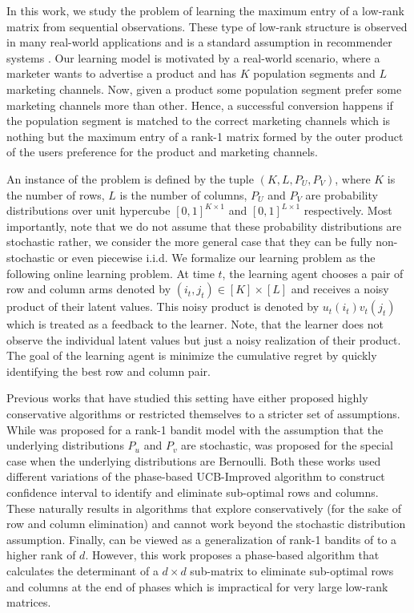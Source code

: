 In this work, we study the problem of learning the maximum entry of a low-rank matrix from sequential observations. These type of low-rank structure is observed in many real-world applications and is a standard assumption in recommender systems \citep{koren2009matrix,ricci2011liorrokach}. Our learning model is motivated by a real-world scenario, where a marketer wants to advertise a product and has $K$ population segments and $L$ marketing channels. Now, given a product some population segment prefer some marketing channels more than other. Hence, a successful conversion happens if the population segment is matched to the correct marketing channels which is nothing but the maximum entry of a rank-1 matrix formed by the outer product of the users preference for the product and marketing channels.  



An instance of the problem is defined by the tuple $(K,L,P_U,P_V)$, where $K$ is the number of rows, $L$ is the number of columns, $P_U$ and $P_V$ are probability distributions over unit hypercube $[0,1]^{K\times 1}$ and $[0,1]^{L\times 1}$ respectively. Most importantly, note that we do not assume that these probability distributions are stochastic rather, we consider the more general case that they can be fully non-stochastic or even piecewise i.i.d. We formalize our learning problem as the following online learning problem. At time $t$, the learning agent chooses a pair of row and column arms denoted by $(i_t, j_t) \in [K]\times [L]$ and receives a noisy product of their latent values. This noisy product is denoted by $u_t(i_t)v_t(j_t)$ which is treated as a feedback to the learner. Note, that the learner does not observe the individual latent values but just a noisy realization of their product. The goal of the learning agent is minimize the cumulative regret by quickly identifying the best row and column pair.


Previous works that have studied this setting have either proposed highly conservative algorithms or restricted themselves to a stricter set of assumptions. While \citet{katariya2016stochastic} was proposed for a rank-1 bandit model with the assumption that the underlying distributions $P_u$ and $P_v$ are stochastic, \citet{katariya2017bernoulli} was proposed for the special case when the underlying distributions are Bernoulli. Both these works used different variations of the phase-based UCB-Improved \citep{auer2010ucb} algorithm to construct confidence interval to identify and eliminate sub-optimal rows and columns. These naturally results in algorithms that explore conservatively (for the sake of row and column elimination) and cannot work beyond the stochastic distribution assumption. Finally, \citet{kveton2017stochastic} can be viewed as a generalization of rank-1 bandits of \citet{katariya2016stochastic} to a higher rank of $d$. However, this work proposes a phase-based algorithm that calculates the determinant of a $d\times d$ sub-matrix to eliminate sub-optimal rows and columns at the end of phases which is impractical for very large low-rank matrices.

